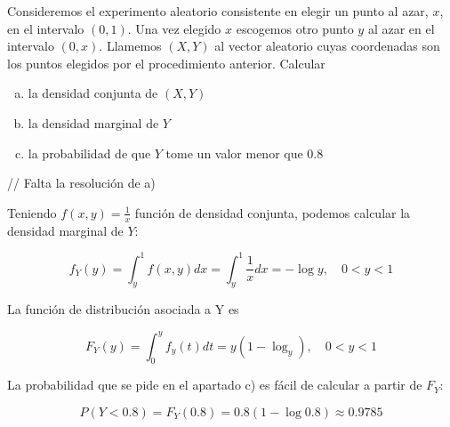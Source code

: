 \begin{theorem}
    
    Consideremos el experimento aleatorio consistente en elegir un punto al azar, $x$, en el intervalo $(0, 1)$. Una vez elegido $x$ escogemos
    otro punto $y$ al azar en el intervalo $(0, x)$. Llamemos $(X, Y)$ al vector aleatorio cuyas coordenadas son los puntos elegidos por el 
    procedimiento anterior. Calcular
    \begin{enumerate}[a)]
        \item la densidad conjunta de $(X, Y)$
        \item la densidad marginal de $Y$
        \item la probabilidad de que $Y$ tome un valor menor que $0.8$
    \end{enumerate}

    // Falta la resolución de a)

    Teniendo $f(x, y) = \frac{1}{x}$ función de densidad conjunta, podemos calcular la densidad marginal de $Y$:

    \[ f_{Y}(y) = \int_{y}^{1}f(x, y)dx = \int_{y}^{1}\frac{1}{x}dx = -\log{y}, \quad 0 < y < 1 \]

    La función de distribución asociada a Y es

    \[ F_{Y}(y) = \int_{0}^{y}f_{y}(t)dt = y(1 - \log_{y}), \quad 0 < y < 1 \]

    La probabilidad que se pide en el apartado c) es fácil de calcular a partir de $F_{Y}$:

    \[ P(Y < 0.8) = F_{Y}(0.8) = 0.8(1 - \log{0.8}) \approx 0.9785 \]

\end{theorem}

\newpage
